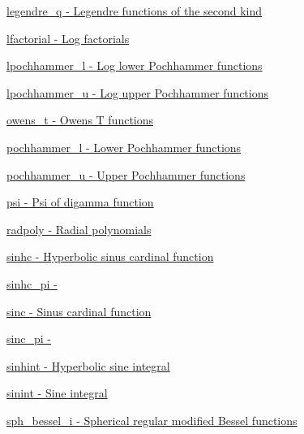 \begin{DoxyItemize}
\item \hyperlink{group__gnu__math__spec__func_gac0bb3b5a3229e7b7f80982785ff8f477}{legendre\+\_\+q -\/ Legendre functions of the second kind}
\item \hyperlink{group__gnu__math__spec__func_ga17b1dc664e1ab95213c340f2453b09e3}{lfactorial -\/ Log factorials}
\item \hyperlink{group__gnu__math__spec__func_ga5a60fbbf559aa86dfe918d9ef23e8a74}{lpochhammer\+\_\+l -\/ Log lower Pochhammer functions}
\item \hyperlink{group__gnu__math__spec__func_ga85e5565a30599065b8ccbc499c5d0d85}{lpochhammer\+\_\+u -\/ Log upper Pochhammer functions}
\item \hyperlink{group__gnu__math__spec__func_ga7a52e8d5df5b110810c4bdba78a9d2ae}{owens\+\_\+t -\/ Owens T functions}
\item \hyperlink{group__gnu__math__spec__func_gafed029416c3c440fea35a3a135991436}{pochhammer\+\_\+l -\/ Lower Pochhammer functions}
\item \hyperlink{group__gnu__math__spec__func_ga4cadb141501737e85c8d6511fe3d3b94}{pochhammer\+\_\+u -\/ Upper Pochhammer functions}
\item \hyperlink{group__gnu__math__spec__func_ga850cdad2e428a553e5adf2474a6a385a}{psi -\/ Psi of digamma function}
\item \hyperlink{group__gnu__math__spec__func_ga2a415dff236d6e4c36150bd5958eaf78}{radpoly -\/ Radial polynomials}
\item \hyperlink{group__gnu__math__spec__func_gad6975a69b8e40a6237b4124b459c6181}{sinhc -\/ Hyperbolic sinus cardinal function}
\item \hyperlink{group__gnu__math__spec__func_ga59ba25b4276fea8c628629420b522b15}{sinhc\+\_\+pi -\/ }
\item \hyperlink{group__gnu__math__spec__func_gab0697cae10f8981fa700ab81c67a7746}{sinc -\/ Sinus cardinal function}
\item \hyperlink{group__gnu__math__spec__func_gacfca76a0549d5c42394e1597f83414da}{sinc\+\_\+pi -\/ }
\item \hyperlink{group__gnu__math__spec__func_ga19941fbce9fb8e097eb757761f9326db}{sinhint -\/ Hyperbolic sine integral}
\item \hyperlink{group__gnu__math__spec__func_ga4b0807985bd194392fc7d7abe4cf2c61}{sinint -\/ Sine integral}
\item \hyperlink{group__gnu__math__spec__func_ga93454a071a189f7cc9e79078526aa3fd}{sph\+\_\+bessel\+\_\+i -\/ Spherical regular modified Bessel functions}

\end{DoxyItemize}
